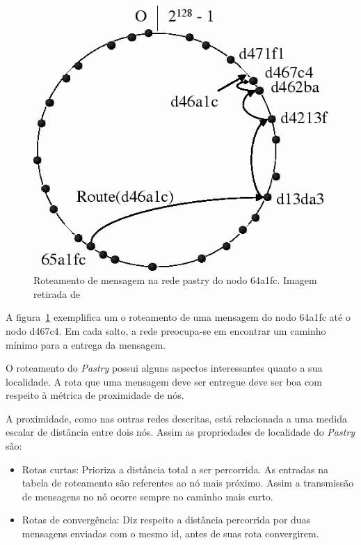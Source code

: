 \begin{figure}
	\centering
	\includegraphics[scale=0.5]{images/roteamento-pastry.png}
	\caption{Roteamento de mensagem na rede pastry do nodo 64a1fc. Imagem retirada de~\cite{rowstron01}}
	\label{fig:roteamento-pastry}
\end{figure}

A figura~\ref{fig:roteamento-pastry} exemplifica um o roteamento de uma mensagem do nodo 64a1fc até o nodo d467c4. Em cada salto, a rede preocupa-se em encontrar um caminho mínimo para a entrega da mensagem.

O roteamento do \emph{Pastry} possui alguns aspectos interessantes quanto a sua localidade. A rota que uma mensagem deve ser entregue deve ser boa com respeito à métrica de proximidade de nós.

A proximidade, como nas outras redes descritas, está relacionada a uma medida escalar de distância entre dois nós. Assim as propriedades de localidade do \emph{Pastry} são:
\begin{itemize}
	\item Rotas curtas: Prioriza a distância total a ser percorrida. As entradas na tabela de roteamento são referentes ao nó mais próximo. Assim a transmissão de mensagens no nó ocorre sempre no caminho mais curto.
	\item Rotas de convergência: Diz respeito a distância percorrida por duas mensagens enviadas com o mesmo id, antes de suas rota convergirem.
\end{itemize}

